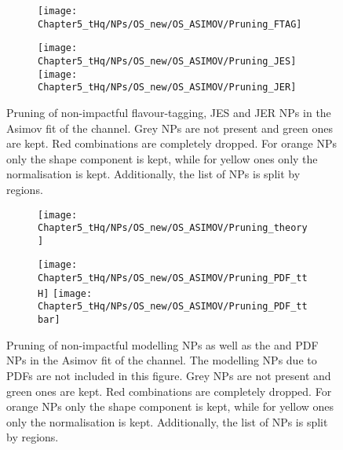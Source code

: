 \begin{figure}[h]
\begin{subfigure}{0.45\textwidth}
  \centering
  \texttt{[image: Chapter5\_tHq/NPs/OS\_new/OS\_ASIMOV/Pruning\_FTAG]}
\end{subfigure}
\hfill 
\begin{subfigure}{0.45\textwidth}
  \texttt{[image: Chapter5\_tHq/NPs/OS\_new/OS\_ASIMOV/Pruning\_JES]}
  \texttt{[image: Chapter5\_tHq/NPs/OS\_new/OS\_ASIMOV/Pruning\_JER]}
\end{subfigure}
   \caption{Pruning of non-impactful flavour-tagging, JES and JER NPs in the Asimov fit of the \dilepOStau channel.  Grey NPs are 
   not present and green ones are kept. Red combinations are completely dropped. For orange NPs only the shape 
   component is kept, while for yellow ones only the normalisation is kept. Additionally, the list of NPs is split by regions.}
  \label{fig:Appendix:AdditionalResults:OS:Asimov:Pruning:instrumental_FTAG}
\end{figure}



\begin{figure}[h]
  \centering
  \begin{subfigure}{0.45\textwidth}
      	\texttt{[image: Chapter5\_tHq/NPs/OS\_new/OS\_ASIMOV/Pruning\_theory]}
  \end{subfigure}
  \hfill
  \begin{subfigure}{0.45\textwidth}
 	\texttt{[image: Chapter5\_tHq/NPs/OS\_new/OS\_ASIMOV/Pruning\_PDF\_ttH]}
  	\texttt{[image: Chapter5\_tHq/NPs/OS\_new/OS\_ASIMOV/Pruning\_PDF\_ttbar]}  
  \end{subfigure}
   \caption{Pruning of non-impactful modelling NPs as well as the \ttH and \ttbar PDF NPs in the Asimov fit of the \dilepOStau channel. 
   The modelling NPs due to PDFs are not included in this figure. Grey NPs are 
   not present and green ones are kept. Red combinations are completely dropped. For orange NPs only the shape 
   component is kept, while for yellow ones only the normalisation is kept. Additionally, the list of NPs is split by regions.}
  \label{fig:Appendix:AdditionalResults:OS:Asimov:Pruning:Theory}
\end{figure}

